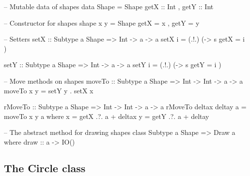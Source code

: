 \begin{code}
-- Mutable data of shapes
data Shape =
     Shape { getX    :: Int
           , getY    :: Int
           }

-- Constructor for shapes
shape x y = Shape { getX = x
                  , getY = y }

-- Setters
setX :: Subtype a Shape => Int -> a -> a
setX i = (.!.) (\s -> s { getX = i} )

setY :: Subtype a Shape => Int -> a -> a
setY i = (.!.) (\s -> s { getY = i} )

-- Move methods on shapes
moveTo :: Subtype a Shape => Int -> Int -> a -> a
moveTo x y = setY y . setX x 

rMoveTo :: Subtype a Shape => Int -> Int -> a -> a
rMoveTo deltax deltay a = moveTo x y a
 where
  x = getX .?. a + deltax
  y = getY .?. a + deltay

-- The abstract method for drawing shapes
class Subtype a Shape => Draw a
 where
  draw :: a -> IO()
\end{code}






\medskip

\subsection{The Circle class}




